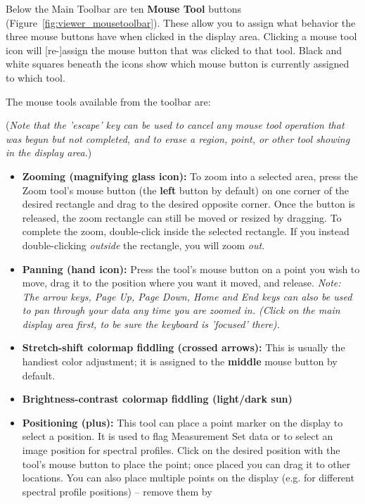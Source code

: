 Below the Main Toolbar are ten {\bf Mouse Tool} buttons
(Figure~\ref{fig:viewer_mousetoolbar}). These allow you to assign
what behavior the three mouse buttons have when clicked in the display area. Clicking a mouse 
tool icon will [re-]assign the mouse button that was clicked to that tool. 
Black and white squares beneath the icons show which mouse button is currently
assigned to which tool.  

The mouse tools available from the toolbar are:

({\em Note that the 'escape' key can be used to cancel any mouse tool operation that was
begun but not completed, and to erase a region, point, or other tool showing in the display area.})

\begin{itemize}
   \item {\bf Zooming (magnifying glass icon):}
     To zoom into a selected area, press the Zoom tool's mouse button
     (the {\bf left} button by default) on one corner of the desired
     rectangle and drag to the desired opposite corner. Once the button is
     released, the zoom rectangle can still be moved or resized by dragging.
     To complete the zoom, double-click inside the selected rectangle. If you
     instead double-clicking {\it outside} the rectangle, you will zoom {\it out}.
   \item {\bf Panning (hand icon):} Press the tool's mouse button on a 
     point you wish to move, drag it to the position where you want it
     moved, and release. {\it Note: The arrow keys, Page Up, Page Down,
     Home and End keys can also be used to pan through your data any time
     you are zoomed in. (Click on the main display area first, to be sure
     the keyboard is 'focused' there).}
   \item {\bf Stretch-shift colormap fiddling (crossed arrows):} This is
     usually the handiest color adjustment; it is assigned to the {\bf middle}
     mouse button by default.
   \item {\bf Brightness-contrast colormap fiddling (light/dark sun)} 
   \item {\bf Positioning (plus):} This tool can place a point
     marker on the display to select a position. It is used to flag
     Measurement Set data or to select an image position for spectral
     profiles.  Click on the desired position with the tool's mouse
     button to place the point; once placed you can drag it to other
     locations. You can also place multiple points on the display
     (e.g. for different spectral profile positions) -- remove them by

\end{itemize}
